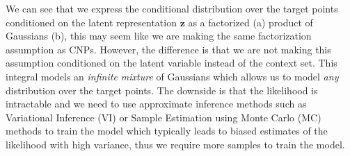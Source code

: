 \documentclass[main.tex]{subfiles}
\begin{document}
We can see that we express the conditional distribution over the target points conditioned on the latent representation $\mathbf{z}$ as a factorized (a) product of Gaussians (b), this may seem like we are making the same factorization assumption as CNPs. However, the difference is that we are not making this assumption conditioned on the latent variable instead of the context set. This integral models an \emph{infinite mixture} of Gaussians which allows us to model \emph{any} distribution over the target points.  The downside is that the likelihood is intractable and we need to use approximate inference methods such as Variational Inference (VI) or Sample Estimation using Monte Carlo (MC) methods to train the model which typically leads to biased estimates of the likelihood with high variance, thus we require more samples to train the model.

\ifSubfilesClassLoaded{%
    \printbibliography{}
}{} 
\end{document}
